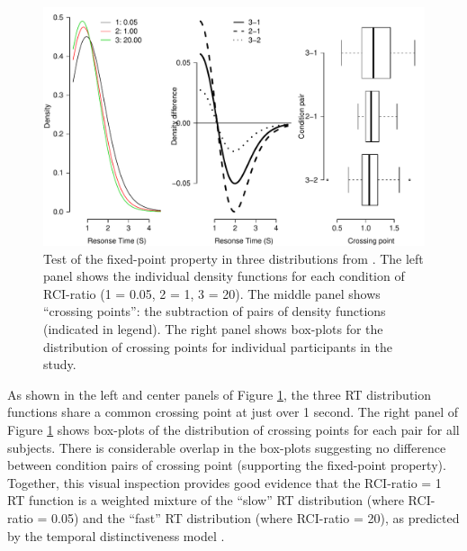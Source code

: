 \documentclass[a4paper, jou, natbib]{apa6}
\begin{document}
\begin{figure}
\begin{center}
\includegraphics[width = \textwidth]{Images/mixtureDistributionData.pdf}
\caption{Test of the fixed-point property in three distributions from \cite{Grangeinrevision}. The left panel shows the individual density functions for each condition of RCI-ratio (1 = 0.05, 2 = 1, 3 = 20). The middle panel shows ``crossing points'': the subtraction of pairs of density functions (indicated in legend). The right panel shows box-plots for the distribution of crossing points for individual participants in the study.}
\label{fig:mixtureDistributionData}
\end{center}
\end{figure}

As shown in the left and center panels of Figure \ref{fig:mixtureDistributionData}, the three RT distribution functions share a common crossing point at just over 1 second. The right panel of Figure \ref{fig:mixtureDistributionData} shows box-plots of the distribution of crossing points for each pair for all subjects. There is considerable overlap in the box-plots suggesting no difference between condition pairs of crossing point (supporting the fixed-point property). Together, this visual inspection provides good evidence that the RCI-ratio = 1 RT function is a weighted mixture of the ``slow'' RT distribution (where RCI-ratio = 0.05) and the ``fast'' RT distribution (where RCI-ratio = 20), as predicted by the temporal distinctiveness model \citep{Grange2015}.
\end{document}
